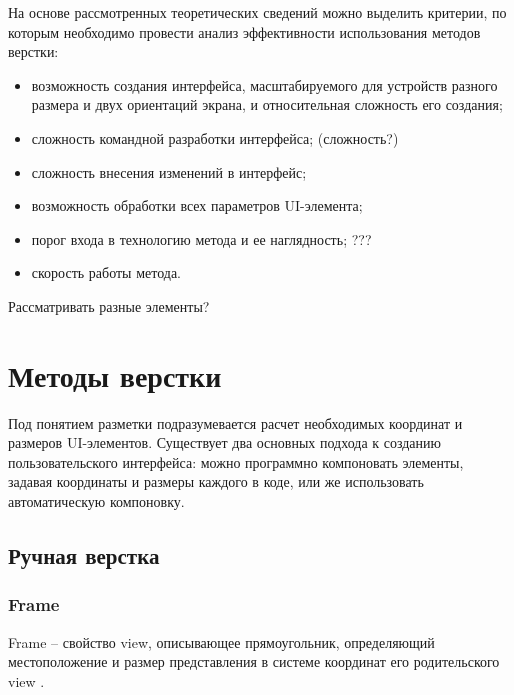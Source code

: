 На основе рассмотренных теоретических сведений можно выделить критерии, по которым необходимо провести анализ эффективности использования методов верстки:

\begin{itemize}
	\item возможность создания интерфейса, масштабируемого для устройств разного размера и двух ориентаций экрана, и относительная сложность его создания;
	\item сложность командной разработки интерфейса; (сложность?)
	\item сложность внесения изменений в интерфейс;
	\item возможность обработки всех параметров UI-элемента;
	\item порог входа в технологию метода и ее наглядность; ???
	\item скорость работы метода.
\end{itemize}

Рассматривать разные элементы?

\chapter{Методы верстки}

Под понятием разметки подразумевается расчет необходимых координат и размеров UI-элементов.
Существует два основных подхода к созданию пользовательского интерфейса: можно программно компоновать элементы, задавая координаты и размеры каждого в коде, или же использовать автоматическую компоновку.

\section{Ручная верстка}

\subsection{Frame}

Frame \cite{frame} -- свойство view, описывающее прямоугольник, определяющий местоположение и размер представления в системе координат его родительского view \cite{superview}.

